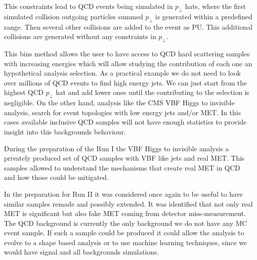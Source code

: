 This constraints lead to \gls{QCD} events being simulated in $p_\perp$ hats, where the first simulated collision outgoing particles summed $p_\perp$ is generated within a predefined range. Then several other collisions are added to the event as \gls{PU}. This additional collisions are generated without any constraints in $p_\perp$. 

This bins method allows the user to have access to \gls{QCD} hard scattering samples with increasing energies which will allow studying the contribution of each one an hypothetical analysis selection. As a practical example we do not need to look over millions of \gls{QCD} events to find high energy jets. We can just start from the highest \gls{QCD} $p_\perp$ hat and add lower ones until the contributing to the selection is negligible. On the other hand, analysis like the \gls{CMS} \gls{VBF} Higgs to invisible analysis, search for event topologies with low energy jets and/or \gls{MET}. In this cases available inclusive \gls{QCD} samples will not have enough statistics to provide insight into this backgrounds behaviour. 

During the preparation of the Run I the \gls{VBF} Higgs to invisible analysis a privately produced set of \gls{QCD} samples with \gls{VBF} like jets and real \gls{MET}. This samples allowed to understand the mechanisms that create real \gls{MET} in \gls{QCD} and how those could be mitigated. 

In the preparation for Run II it was considered once again to be useful to have similar samples remade and possibly extended. It was identified that not only real \gls{MET} is significant but also fake \gls{MET} coming from detector miss-measurement. The \gls{QCD} background is currently the only background we do not have any \gls{MC} event sample. If such a sample could be produced it could allow the analysis to evolve to a shape based analysis or to use machine learning techniques, since we would have signal and all backgrounds simulations. 



